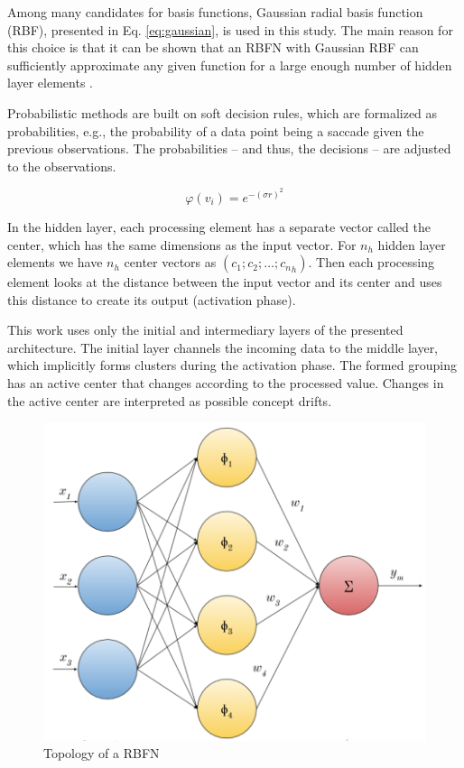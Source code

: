 \documentclass[preprint,12pt]{elsarticle}
\begin{document}
Among many candidates for basis functions, Gaussian radial basis function (RBF), presented in Eq. \ref{eq:gaussian}, is used in this study. The main reason for this choice is that it can be shown that an RBFN with Gaussian RBF can sufficiently approximate any given function for a large enough number of hidden layer elements \cite{Theodoridis:2008:PRF:1457541}.

Probabilistic methods are built on soft decision rules, which are formalized as probabilities, e.g.,  the probability of a data point being a saccade given the previous observations. The probabilities – and thus, the decisions – are adjusted to the observations.


\begin{equation}
    \label{eq:gaussian}
    \varphi (v_{i})=e^{-(\sigma r)^{2}}
\end{equation}

In the hidden layer, each processing element has a separate vector called the center, which has the same dimensions as the input vector.
For $n_h$ hidden layer elements we have $n_h$ center vectors as $(c_1; c_2; \ldots; {c_n}_h)$.
Then each processing element looks at the distance between the input vector and its center and uses this distance to create its output (activation phase).


This work uses only the initial and intermediary layers of the presented architecture.
The initial layer channels the incoming data to the middle layer, which implicitly forms clusters during the activation phase.
The formed grouping has an active center that changes according to the processed value.
Changes in the active center are interpreted as possible concept drifts.

\begin{figure}[h!]
\begin{center}
    \includegraphics[scale=0.75]{img/rbf_arq.png}
    \caption{Topology of a RBFN}
    \label{fig:rbg_arq}
\end{center}
\end{figure}
\end{document}
